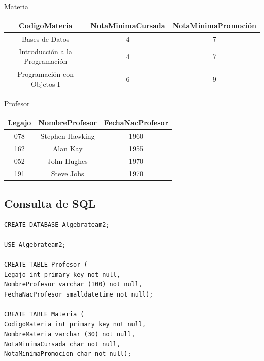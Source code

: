 \documentclass[a4paper, 12pt]{article}
\begin{document}
\begin{justify}
\begin{table}[H]
            Materia\\
            \begin{tabular}{|c|c|c|}
            \hline
            \textbf{CodigoMateria}         & \textbf{NotaMinimaCursada} & \textbf{NotaMinimaPromoción} \\ \hline
            Bases de Datos                 & 4                          & 7                            \\ \hline
            Introducción a la Programación & 4                          & 7                            \\ \hline
            Programación con Objetos I     & 6                          & 9                            \\ \hline
            \end{tabular}
        \end{table}
        \begin{table}[H]
            Profesor\\
            \begin{tabular}{|c|c|c|}
            \hline
            \textbf{Legajo} & \textbf{NombreProfesor} & \textbf{FechaNacProfesor} \\ \hline
            078             & Stephen Hawking         & 1960                      \\ \hline
            162             & Alan Kay                & 1955                      \\ \hline
            052             & John Hughes             & 1970                      \\ \hline
            191             & Steve Jobs              & 1970                      \\ \hline
            \end{tabular}
            \end{table}
        \subsection{Consulta de SQL}
\begin{verbatim}
CREATE DATABASE Algebrateam2;

USE Algebrateam2;

CREATE TABLE Profesor (
Legajo int primary key not null,
NombreProfesor varchar (100) not null,
FechaNacProfesor smalldatetime not null);

CREATE TABLE Materia (
CodigoMateria int primary key not null,
NombreMateria varchar (30) not null,
NotaMinimaCursada char not null,
NotaMinimaPromocion char not null);


\end{verbatim}
\end{justify}
\end{document}
